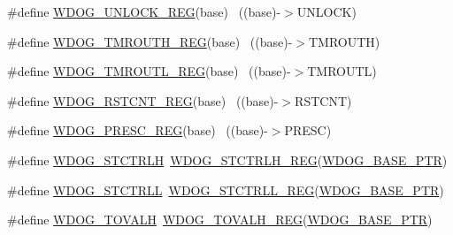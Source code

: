 \begin{DoxyCompactItemize}
\item 
\#define \hyperlink{group___w_d_o_g___register___accessor___macros_ga0424f1f517c5ed49f00c67fc4454bba5}{W\+D\+O\+G\+\_\+\+U\+N\+L\+O\+C\+K\+\_\+\+R\+EG}(base)                                    ~((base)-\/$>$U\+N\+L\+O\+CK)
\item 
\#define \hyperlink{group___w_d_o_g___register___accessor___macros_ga6c5cca0fc2aeec6d1f8808f55c57acbb}{W\+D\+O\+G\+\_\+\+T\+M\+R\+O\+U\+T\+H\+\_\+\+R\+EG}(base)                                  ~((base)-\/$>$T\+M\+R\+O\+U\+TH)
\item 
\#define \hyperlink{group___w_d_o_g___register___accessor___macros_gaed1d5071ac9fb7f531fdda660780a329}{W\+D\+O\+G\+\_\+\+T\+M\+R\+O\+U\+T\+L\+\_\+\+R\+EG}(base)                                  ~((base)-\/$>$T\+M\+R\+O\+U\+TL)
\item 
\#define \hyperlink{group___w_d_o_g___register___accessor___macros_ga321d566d296ee323809e242077a1c776}{W\+D\+O\+G\+\_\+\+R\+S\+T\+C\+N\+T\+\_\+\+R\+EG}(base)                                    ~((base)-\/$>$R\+S\+T\+C\+NT)
\item 
\#define \hyperlink{group___w_d_o_g___register___accessor___macros_gacbfa99926928928f05da2e4c752ea945}{W\+D\+O\+G\+\_\+\+P\+R\+E\+S\+C\+\_\+\+R\+EG}(base)                                      ~((base)-\/$>$P\+R\+E\+SC)
\item 
\#define \hyperlink{group___w_d_o_g___register___accessor___macros_ga682e2c5e771ae99e572597d5a9ee8620}{W\+D\+O\+G\+\_\+\+S\+T\+C\+T\+R\+LH}~\hyperlink{group___w_d_o_g___register___accessor___macros_gafe3961a26965f4d22fa82eb4a6906efa}{W\+D\+O\+G\+\_\+\+S\+T\+C\+T\+R\+L\+H\+\_\+\+R\+EG}(\hyperlink{group___w_d_o_g___peripheral_ga72fb27c7bc1ae124f180d8f2c7b9fa79}{W\+D\+O\+G\+\_\+\+B\+A\+S\+E\+\_\+\+P\+TR})
\item 
\#define \hyperlink{group___w_d_o_g___register___accessor___macros_gabe98a0873c234c1297e69e1cfb7ebb9e}{W\+D\+O\+G\+\_\+\+S\+T\+C\+T\+R\+LL}~\hyperlink{group___w_d_o_g___register___accessor___macros_gab5f636177e7295761f4d366fc6f2d9c5}{W\+D\+O\+G\+\_\+\+S\+T\+C\+T\+R\+L\+L\+\_\+\+R\+EG}(\hyperlink{group___w_d_o_g___peripheral_ga72fb27c7bc1ae124f180d8f2c7b9fa79}{W\+D\+O\+G\+\_\+\+B\+A\+S\+E\+\_\+\+P\+TR})
\item 
\#define \hyperlink{group___w_d_o_g___register___accessor___macros_ga64a1039724acdbacf39352885a760505}{W\+D\+O\+G\+\_\+\+T\+O\+V\+A\+LH}~\hyperlink{group___w_d_o_g___register___accessor___macros_gaa18bf2a6abf1641d711ee0a8e963d704}{W\+D\+O\+G\+\_\+\+T\+O\+V\+A\+L\+H\+\_\+\+R\+EG}(\hyperlink{group___w_d_o_g___peripheral_ga72fb27c7bc1ae124f180d8f2c7b9fa79}{W\+D\+O\+G\+\_\+\+B\+A\+S\+E\+\_\+\+P\+TR})

\end{DoxyCompactItemize}
